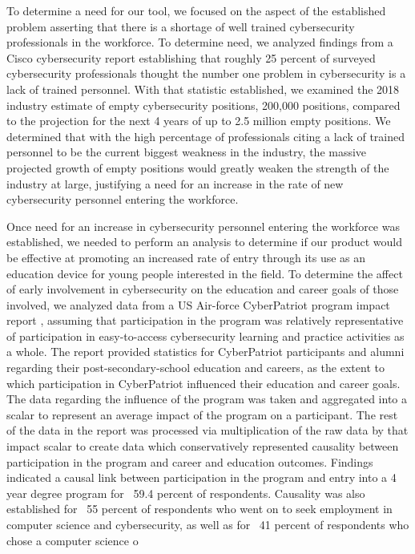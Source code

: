 \documentclass[openright]{report}
\begin{document}
\par To determine a need for our tool, we focused on the aspect of the established problem asserting that there is a shortage of well trained cybersecurity professionals in the workforce. To determine need, we analyzed findings from a Cisco cybersecurity report \cite{Cisco__annual_report} establishing that roughly 25 percent of surveyed cybersecurity professionals thought the number one problem in cybersecurity is a lack of trained personnel. With that statistic established, we examined the 2018 industry estimate of empty cybersecurity positions, 200,000 positions, compared to the projection for the next 4 years of up to 2.5 million empty positions. We determined that with the high percentage of professionals citing a lack of trained personnel to be the current biggest weakness in the industry, the massive projected growth of empty positions would greatly weaken the strength of the industry at large, justifying a need for an increase in the rate of new cybersecurity personnel entering the workforce.

\par Once need for an increase in cybersecurity personnel entering the workforce was established, we needed to perform an analysis to determine if our product would be effective at promoting an increased rate of entry through its use as an education device for young people interested in the field. To determine the affect of early involvement in cybersecurity on the education and career goals of those involved, we analyzed data from a US Air-force CyberPatriot program impact report \cite{cyberpatriot}, assuming that participation in the program was relatively representative of participation in easy-to-access cybersecurity learning and practice activities as a whole. The report provided statistics for CyberPatriot participants and alumni regarding their post-secondary-school education and careers, as the extent to which participation in CyberPatriot influenced their education and career goals. The data regarding the influence of the program was taken and aggregated into a scalar to represent an average impact of the program on a participant. The rest of the data in the report was processed via multiplication of the raw data by that impact scalar to create data which conservatively represented causality between participation in the program and career and education outcomes. Findings indicated a causal link between participation in the program and entry into a 4 year degree program for ~59.4 percent of respondents. Causality was also established for ~55 percent of respondents who went on to seek employment in computer science and cybersecurity, as well as for ~41 percent of respondents who chose a computer science o 
\end{document}
